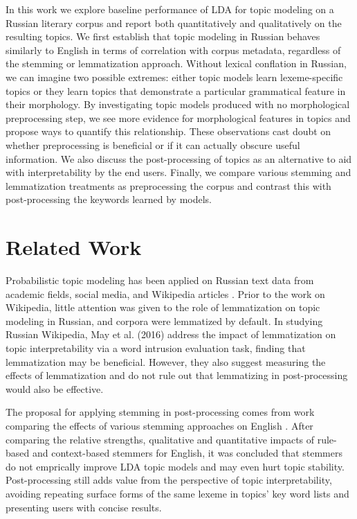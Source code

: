 \documentclass[11pt,a4paper]{article}
\begin{document}
In this work we explore baseline performance of LDA for topic modeling on a Russian literary corpus and report both quantitatively and qualitatively on the resulting topics. We first establish that topic modeling in Russian behaves similarly to English in terms of correlation with corpus metadata, regardless of the stemming or lemmatization approach. Without lexical conflation in Russian, we can imagine two possible extremes: either topic models learn lexeme-specific topics or they learn topics that demonstrate a particular grammatical feature in their morphology. By investigating topic models produced with no morphological preprocessing step, we see more evidence for morphological features in topics and propose ways to quantify this relationship. These observations cast doubt on whether preprocessing is beneficial or if it can actually obscure useful information. We also discuss the post-processing of topics as an alternative to aid with interpretability by the end users. Finally, we compare various stemming and lemmatization treatments as preprocessing the corpus and contrast this with post-processing the keywords learned by models.

\section{Related Work}
Probabilistic topic modeling has been applied on Russian text data from academic fields, social media, and Wikipedia articles \cite{mitrofanova2015probabilistic,koltsova2013,May2016AnAO}. Prior to the work on Wikipedia, little attention was given to the role of lemmatization on topic modeling in Russian, and corpora were lemmatized by default. In studying Russian Wikipedia, May et al. (2016) address the impact of lemmatization on topic interpretability via a word intrusion evaluation task, finding that lemmatization may be beneficial. However, they also suggest measuring the effects of lemmatization and do not rule out that lemmatizing in post-processing would also be effective.

The proposal for applying stemming in post-processing comes from work comparing the effects of various stemming approaches on English \cite{schofield-mimno-2016-comparing}. After comparing the relative strengths, qualitative and quantitative impacts of rule-based and context-based stemmers for English, it was concluded that stemmers do not emprically improve LDA topic models and may even hurt topic stability. Post-processing still adds value from the perspective of topic interpretability, avoiding repeating surface forms of the same lexeme in topics' key word lists and presenting users with concise results.
\end{document}
